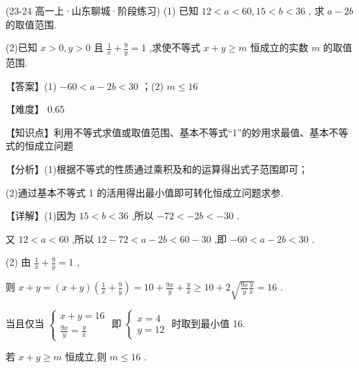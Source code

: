 \documentclass[11pt,a4paper]{article}
\begin{document}
\sclear
\begin{hmwk} 
 (23-24 高一上·山东聊城·阶段练习) (1) 已知 \(\displaystyle {12} < a < {60},{15} < b < {36}\) , 求 \(\displaystyle a - {2b}\) 的取值范围.

(2)已知 \(\displaystyle x > 0,y > 0\) 且 \(\displaystyle \frac{1}{x} + \frac{9}{y} = 1\) ,求使不等式 \(\displaystyle x + y \geq  m\) 恒成立的实数 \(\displaystyle m\) 的取值范围.

\begin{jiexi}[65]
【答案】(1) \(\displaystyle - {60} < a - {2b} < {30}\) ；(2) \(\displaystyle m \leq  {16}\)

【难度】 0.65

【知识点】利用不等式求值或取值范围、基本不等式“1”的妙用求最值、基本不等式的恒成立问题

【分析】(1)根据不等式的性质通过乘积及和的运算得出式子范围即可；

(2)通过基本不等式 1 的活用得出最小值即可转化恒成立问题求参.

【详解】(1)因为 \(\displaystyle {15} < b < {36}\) ,所以 \(\displaystyle - {72} <  - {2b} <  - {30}\) .

又 \(\displaystyle {12} < a < {60}\) ,所以 \(\displaystyle {12} - {72} < a - {2b} < {60} - {30}\) ,即 \(\displaystyle - {60} < a - {2b} < {30}\) .

(2) 由 \(\displaystyle \frac{1}{x} + \frac{9}{y} = 1\) ,

则 \(\displaystyle x + y = \left( {x + y}\right) \left( {\frac{1}{x} + \frac{9}{y}}\right)  = {10} + \frac{9x}{y} + \frac{y}{x} \geq  {10} + 2\sqrt{\frac{9x}{y}\frac{y}{x}} = {16}\) .

当且仅当 \(\displaystyle \left\{  \begin{array}{l} x + y = {16} \\  \frac{9x}{y} = \frac{y}{x} \end{array}\right.\) 即 \(\displaystyle \left\{  \begin{array}{l} x = 4 \\  y = {12} \end{array}\right.\) 时取到最小值 16.

若 \(\displaystyle x + y \geq  m\) 恒成立,则 \(\displaystyle m \leq  {16}\) .

\end{jiexi}
\end{hmwk}
\end{document}
